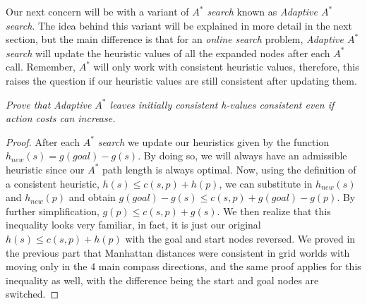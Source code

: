 Our next concern will be with a variant of \emph{$A^*$ search} known as \emph{Adaptive $A^*$ search}. The idea behind this variant will be explained in more detail in the next section, but the main difference is that for an \emph{online search} problem, \emph{Adaptive $A^*$ search} will update the heuristic values of all the expanded nodes after each $A^*$ call. Remember, $A^*$ will only work with consistent heuristic values, therefore, this raises the question if our heuristic values are still consistent after updating them.

\begin{qoute}
\emph{Prove that Adaptive $A^*$ leaves initially consistent h-values consistent even if action costs can increase.}
\end{qoute}
\begin{proof}
After each \emph{$A^*$ search} we update our heuristics given by the function $h_{new}(s) = g(goal) - g(s)$. By doing so, we will always have an admissible heuristic since our $A^*$ path length is always optimal. Now, using the definition of a consistent heuristic, $h(s) \leq c(s,p) + h(p)$, we can substitute in $h_{new}(s)$ and $h_{new}(p)$ and obtain $g(goal) - g(s) \leq c(s,p) + g(goal) - g(p)$. By further simplification, $g(p) \leq c(s,p) + g(s)$. We then realize that this inequality looks very familiar, in fact, it is just our original $h(s) \leq c(s,p) + h(p)$ with the goal and start nodes reversed. We proved in the previous part that Manhattan distances were consistent in grid worlds with moving only in the 4 main compass directions, and the same proof applies for this inequality as well, with the difference being the start and goal nodes are switched.
\end{proof}


